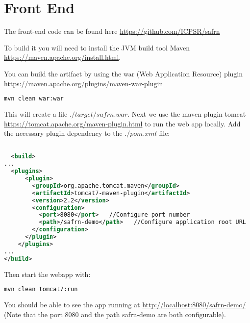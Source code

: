 \documentclass[12pt]{article}
\begin{document}
\section{Front End}

The front-end code can be found here
\url{https://github.com/ICPSR/safrn}

To build it you will need to install the JVM build tool Maven
\url{https://maven.apache.org/install.html}.

You can build the artifact by using the war (Web Application Resource)
plugin \url{https://maven.apache.org/plugins/maven-war-plugin}

\begin{lstlisting}[language=sh]
mvn clean war:war
\end{lstlisting}

This will create a file $./target/safrn.war$. Next we use the maven
plugin tomcat \url{https://tomcat.apache.org/maven-plugin.html} to run
the web app locally. Add the necessary plugin dependency to the
$./pom.xml$ file:
\begin{lstlisting}[language=xml]

  <build>
...
  <plugins>
      <plugin>
        <groupId>org.apache.tomcat.maven</groupId>
        <artifactId>tomcat7-maven-plugin</artifactId>
        <version>2.2</version>
        <configuration>
          <port>8080</port>   //Configure port number
          <path>/safrn-demo</path>   //Configure application root URL
        </configuration>
      </plugin>
    </plugins>
...
</build>

\end{lstlisting}

Then start the webapp with:

\begin{lstlisting}[language=sh]
mvn clean tomcat7:run
\end{lstlisting}

You should be able to see the app running at
\url{http://localhost:8080/safrn-demo/} (Note that the port 8080 and
the path safrn-demo are both configurable).
\end{document}
